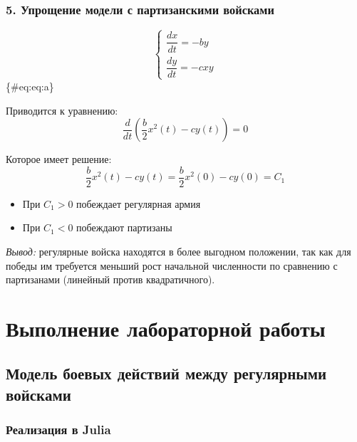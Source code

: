 \documentclass[
  12pt,
  a4paper,
  DIV=11,
  numbers=noendperiod]{scrreprt}
\providecommand{\tightlist}{%
  \setlength{\itemsep}{0pt}\setlength{\parskip}{0pt}}\usepackage{longtable,booktabs,array}
\begin{document}
\subsection{5. Упрощение модели с партизанскими
войсками}\label{ux443ux43fux440ux43eux449ux435ux43dux438ux435-ux43cux43eux434ux435ux43bux438-ux441-ux43fux430ux440ux442ux438ux437ux430ux43dux441ux43aux438ux43cux438-ux432ux43eux439ux441ux43aux430ux43cux438}

\[
\begin{cases}
\dfrac{dx}{dt} = - by\\
\dfrac{dy}{dt} = -cxy
\end{cases}
\]\{\#eq:eq:a\}

Приводится к уравнению: \[
\dfrac{d}{dt}\left(\frac{b}{2}x^2(t) - cy(t)\right) = 0
\]

Которое имеет решение: \[
\dfrac{b}{2}x^2(t) - cy(t) = \frac{b}{2}x^2(0) - cy(0) = C_1
\]

\begin{itemize}
\tightlist
\item
  При \(C_1 > 0\) побеждает регулярная армия
\item
  При \(C_1 < 0\) побеждают партизаны
\end{itemize}

\emph{Вывод:} регулярные войска находятся в более выгодном положении,
так как для победы им требуется меньший рост начальной численности по
сравнению с партизанами (линейный против квадратичного).

\chapter{Выполнение лабораторной
работы}\label{ux432ux44bux43fux43eux43bux43dux435ux43dux438ux435-ux43bux430ux431ux43eux440ux430ux442ux43eux440ux43dux43eux439-ux440ux430ux431ux43eux442ux44b}

\section{Модель боевых действий между регулярными
войсками}\label{ux43cux43eux434ux435ux43bux44c-ux431ux43eux435ux432ux44bux445-ux434ux435ux439ux441ux442ux432ux438ux439-ux43cux435ux436ux434ux443-ux440ux435ux433ux443ux43bux44fux440ux43dux44bux43cux438-ux432ux43eux439ux441ux43aux430ux43cux438-1}

\subsection{Реализация в
Julia}\label{ux440ux435ux430ux43bux438ux437ux430ux446ux438ux44f-ux432-julia}
\end{document}
